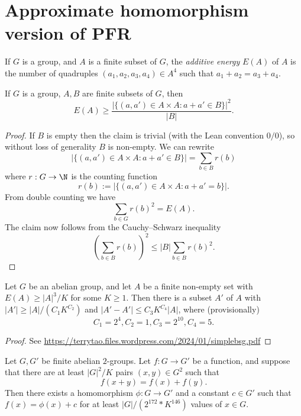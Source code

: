 \chapter{Approximate homomorphism version of PFR}

\begin{definition}\label{energy-def}\leanok  If $G$ is a group, and $A$ is a finite subset of $G$, the \emph{additive energy} $E(A)$ of $A$ is the number of quadruples $(a_1,a_2,a_3,a_4) \in A^4$ such that $a_1+a_2 = a_3+a_4$.
\end{definition}

\begin{lemma}\label{cs-bound}\leanok  If $G$ is a group, $A,B$ are finite subsets of $G$, then
$$ E(A) \geq \frac{|\{ (a,a') \in A \times A: a+a' \in B \}|^2}{|B|}.$$
\end{lemma}

\begin{proof}\leanok  If $B$ is empty then the claim is trivial (with the Lean convention $0/0$), so without loss of generality $B$ is non-empty.  We can rewrite
$$ |\{ (a,a') \in A \times A: a+a' \in B \}| = \sum_{b \in B} r(b)$$
where $r: G \to \N$ is the counting function
$$ r(b) := |\{ (a,a') \in A \times A: a+a' = b \}|.$$
From double counting we have
$$ \sum_{b \in G} r(b)^2 = E(A).$$
The claim now follows from the Cauchy--Schwarz inequality
$$ (\sum_{b \in B} r(b))^2 \leq |B| \sum_{b \in B} r(b)^2.$$
\end{proof}

\begin{lemma}\label{bsg}\leanok Let $G$ be an abelian group, and let $A$ be a finite non-empty set with $E(A) \geq |A|^3 / K$ for some $K \geq 1$.  Then there is a subset $A'$ of $A$ with $|A'| \geq |A| / (C_1 K^{C_2})$ and $|A'-A'| \leq C_3 K^{C_4} |A|$, where (provisionally)
$$ C_1 = 2^4, C_2 = 1, C_3 = 2^{10}, C_4 = 5.$$
\end{lemma}

\begin{proof}\leanok See \url{https://terrytao.files.wordpress.com/2024/01/simplebsg.pdf}
\end{proof}

\begin{theorem}\label{approx-hom-pfr}\leanok Let $G,G'$ be finite abelian $2$-groups.
  Let $f: G \to G'$ be a function, and suppose that there are at least $|G|^2 / K$ pairs $(x,y) \in G^2$ such that
$$ f(x+y) = f(x) + f(y).$$
Then there exists a homomorphism $\phi: G \to G'$ and a constant $c \in G'$
such that $f(x) = \phi(x)+c$ for at least $|G| / (2 ^ {172} * K ^ {146})$ values of $x \in G$.
\end{theorem}

